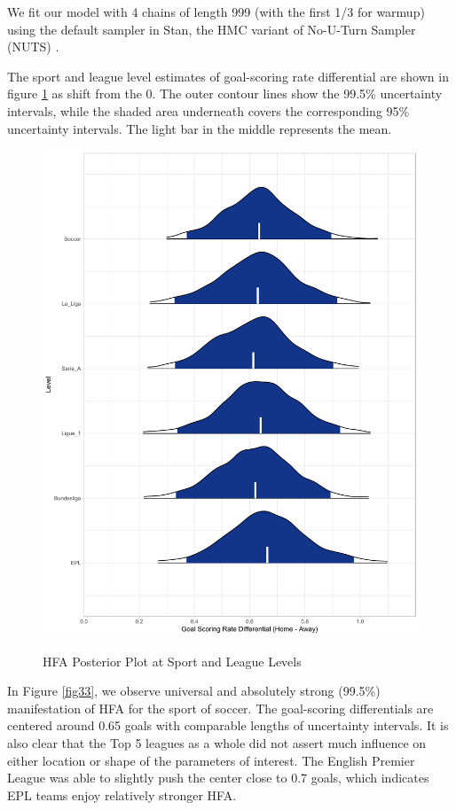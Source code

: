 \documentclass[USenglish]{article}
\begin{document}
We fit our model with 4 chains of length 999 (with the first 1/3 for warmup) using the default sampler in Stan, the HMC variant of No-U-Turn Sampler (NUTS) \citep{Hoffman2014}.  

The sport and league level estimates of goal-scoring rate differential are shown in figure \ref{fig31} as shift from the 0. The outer contour lines show the 99.5\% uncertainty intervals, while the shaded area underneath covers the corresponding 95\% uncertainty intervals. The light bar in the middle represents the mean.

\begin{figure}
\caption{HFA Posterior Plot at Sport and League Levels}
\centering
{\includegraphics[width=0.60\linewidth]{HFA32.pdf}}
\label{fig31}
\end{figure}

In Figure \ref{fig33}, we observe universal and absolutely strong (99.5\%) manifestation of HFA for the sport of soccer. The goal-scoring differentials are centered around 0.65 goals with comparable lengths of uncertainty intervals.  
It is also clear that the Top 5 leagues as a whole did not assert much influence on either location or shape of the parameters of interest. The English Premier League was able to slightly push the center close to 0.7 goals, which indicates EPL teams enjoy relatively stronger HFA.
\end{document}
